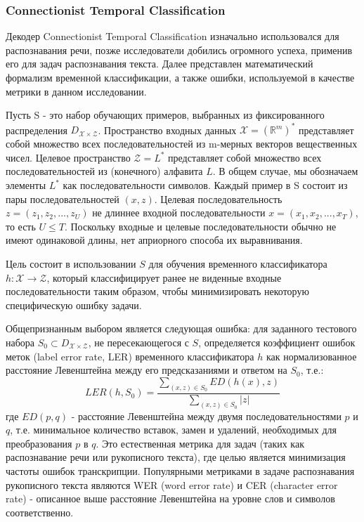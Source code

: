 \subsubsection{Connectionist Temporal Classification}
Декодер Connectionist Temporal Classification изначально использовался для распознавания речи, позже исследователи добились огромного успеха, применив его для задач распознавания текста. Далее представлен математический формализм временной классификации, а также ошибки, используемой в качестве метрики в данном исследовании.

Пусть S - это набор обучающих примеров, выбранных из фиксированного распределения $D_{\mathcal{X} \times \mathcal{Z}}$. Пространство входных данных $\mathcal{X} = (\mathbb{R}^m)^*$ представляет собой множество всех последовательностей из m-мерных векторов вещественных чисел. Целевое пространство $\mathcal{Z} = L^*$ представляет собой множество всех последовательностей из (конечного) алфавита $L$. В общем случае, мы обозначаем элементы $L^*$ как последовательности символов. Каждый пример в S состоит из пары последовательностей $(x, z)$. Целевая последовательность $z = (z_1, z_2, ..., z_U)$ не длиннее входной последовательности $x = (x_1, x_2, ..., x_T)$, то есть $U \leq T$. Поскольку входные и целевые последовательности обычно не имеют одинаковой длины, нет априорного способа их выравнивания.

Цель состоит в использовании $S$ для обучения временного классификатора $h : \mathcal{X} \rightarrow \mathcal{Z}$, который классифицирует ранее не виденные входные последовательности таким образом, чтобы минимизировать некоторую специфическую ошибку задачи.

Общепризнанным выбором является следующая ошибка: для заданного тестового набора $S_0 \subset D_{\mathcal{X} \times \mathcal{Z}}$, не пересекающегося с $S$, определяется коэффициент ошибок меток (label error rate, LER) временного классификатора $h$ как нормализованное расстояние Левенштейна между его предсказаниями и ответом на $S_0$, т.е.:
\begin{equation}
	LER(h, S_0) = \frac{\sum_{(x,z) \in S_0} ED(h(x), z)}{\sum_{(x,z) \in S_0} |z|}
\end{equation}
где $ED(p, q)$ - расстояние Левенштейна между двумя последовательностями $p$ и $q$, т.е. минимальное количество вставок, замен и удалений, необходимых для преобразования $p$ в $q$.
Это естественная метрика для задач (таких как распознавание речи или рукописного текста), где целью является минимизация частоты ошибок транскрипции. Популярными метриками в задаче распознавания рукописного текста являются WER (word error rate) и CER (character error rate) - описанное выше расстояние Левенштейна на уровне слов и символов соответственно.


